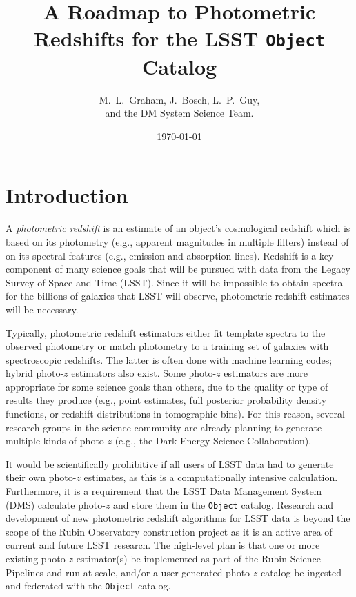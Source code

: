 \documentclass[DM,lsstdraft,toc]{lsstdoc}
\title[Photo-$z$ for LSST Objects]{A Roadmap to Photometric Redshifts for the LSST {\tt Object} Catalog}
\author{M.~L.~Graham, J.~Bosch, L.~P.~Guy, \\ and the DM System Science Team.}
\date{\today}
\begin{document}
\maketitle



\section{Introduction} \label{sec:intro}

A {\it photometric redshift} is an estimate of an object's cosmological redshift which is based on its photometry (e.g., apparent magnitudes in multiple filters) instead of on its spectral features (e.g., emission and absorption lines). 
Redshift is a key component of many science goals that will be pursued with data from the Legacy Survey of Space and Time (LSST).
Since it will be impossible to obtain spectra for the billions of galaxies that LSST will observe, photometric redshift estimates will be necessary.

Typically, photometric redshift estimators either fit template spectra to the observed photometry or match photometry to a training set of galaxies with spectroscopic redshifts. 
The latter is often done with machine learning codes;  hybrid photo-$z$ estimators also exist. 
Some photo-$z$ estimators are more appropriate for some science goals than others, due to the quality or type of results they produce (e.g., point estimates, full posterior probability density functions, or redshift distributions in tomographic bins).
For this reason, several research groups in the science community are already planning to generate multiple kinds of photo-$z$ (e.g., the Dark Energy Science Collaboration).

It would be scientifically prohibitive if all users of LSST data had to generate their own photo-$z$ estimates, as this is a computationally intensive calculation.
Furthermore, it is a requirement that the LSST Data Management System (DMS) calculate photo-$z$ and store them in the {\tt Object} catalog.
Research and development of new photometric redshift algorithms for LSST data is beyond the scope of the Rubin Observatory construction project as it is an active area of current and future LSST research.
The high-level plan is that one or more existing photo-$z$ estimator(s) be implemented as part of the Rubin Science Pipelines and run at scale, and/or a user-generated photo-$z$ catalog be ingested and federated with the {\tt Object} catalog.
\end{document}
